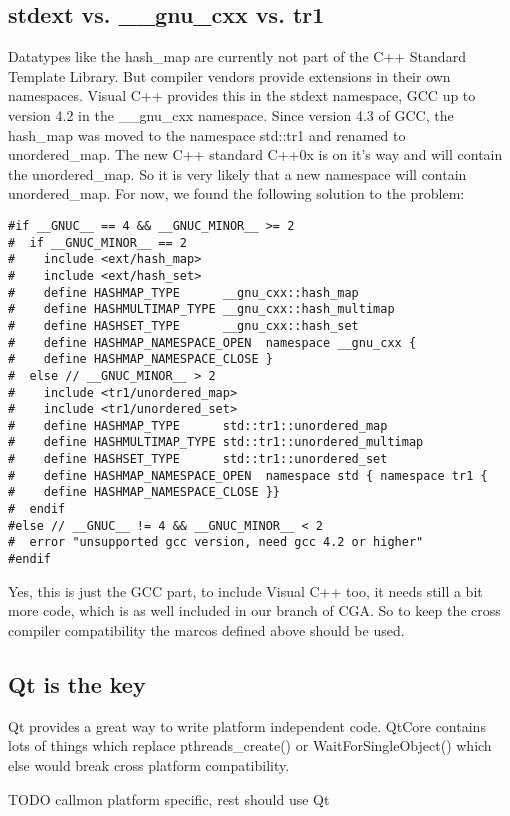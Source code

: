\subsection{stdext vs. \_\_gnu\_cxx vs. tr1} Datatypes like the hash\_map are currently not part of the C++ Standard Template Library. But compiler vendors provide extensions in their own namespaces. Visual C++ provides this in the stdext namespace, GCC up to version 4.2 in the \_\_gnu\_cxx namespace. Since version 4.3 of GCC, the hash\_map was moved to the namespace std::tr1 and renamed to unordered\_map. The new C++ standard C++0x is on it's way and will contain the unordered\_map. So it is very likely that a new namespace will contain unordered\_map. For now, we found the following solution to the problem:
\begin{verbatim}
#if __GNUC__ == 4 && __GNUC_MINOR__ >= 2
#  if __GNUC_MINOR__ == 2
#    include <ext/hash_map>
#    include <ext/hash_set>
#    define HASHMAP_TYPE      __gnu_cxx::hash_map
#    define HASHMULTIMAP_TYPE __gnu_cxx::hash_multimap
#    define HASHSET_TYPE      __gnu_cxx::hash_set
#    define HASHMAP_NAMESPACE_OPEN  namespace __gnu_cxx {
#    define HASHMAP_NAMESPACE_CLOSE }
#  else // __GNUC_MINOR__ > 2
#    include <tr1/unordered_map>
#    include <tr1/unordered_set>
#    define HASHMAP_TYPE      std::tr1::unordered_map
#    define HASHMULTIMAP_TYPE std::tr1::unordered_multimap
#    define HASHSET_TYPE      std::tr1::unordered_set
#    define HASHMAP_NAMESPACE_OPEN  namespace std { namespace tr1 {
#    define HASHMAP_NAMESPACE_CLOSE }}
#  endif
#else // __GNUC__ != 4 && __GNUC_MINOR__ < 2
#  error "unsupported gcc version, need gcc 4.2 or higher"
#endif
\end{verbatim}
Yes, this is just the GCC part, to include Visual C++ too, it needs still a bit more code, which is as well included in our branch of CGA. So to keep the cross compiler compatibility the marcos defined above should be used. 

\subsection{Qt is the key} Qt provides a great way to write platform independent code. QtCore contains lots of things which replace pthreads\_create() or WaitForSingleObject() which else would break cross platform compatibility. 



TODO callmon platform specific, rest should use Qt
